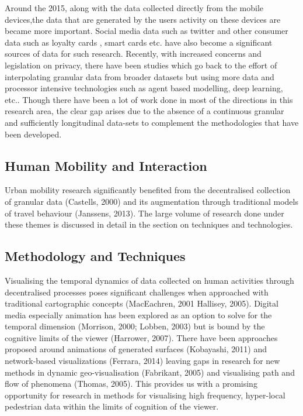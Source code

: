Around the 2015, along with the data collected directly from the mobile devices,the data that are generated by the users activity on these devices are became more important.
Social media data such as twitter \citep{lansley2016} and other consumer data such as loyalty cards \citep{lloyd2018}, smart cards \citep{ordonez2012} etc. have also become a significant sources of data for such research.
Recently, with increased concerns and legislation on privacy, there have been studies which go back to the effort of interpolating granular data from broader datasets but using more data and processor intensive technologies such as agent based modelling\cite[-2.5cm]{crols2019}, deep learning, etc.\cite{shibata2019}.
Though there have been a lot of work done in most of the directions in this research area, the clear gap arises due to the absence of a continuous granular and sufficiently longitudinal data-sets to complement the methodologies that have been developed. 


\subsection{Human Mobility and Interaction}
Urban mobility research significantly benefited from the decentralised collection of granular data (Castells, 2000) and its augmentation through traditional models of travel behaviour (Janssens, 2013).
The large volume of research done under these themes is discussed in detail in the section on techniques and technologies.

\subsection{Methodology and Techniques}
Visualising the temporal dynamics of data collected on human activities through decentralised processes poses significant challenges when approached with traditional cartographic concepts (MacEachren, 2001 Hallisey, 2005).
Digital media especially animation has been explored as an option to solve for the temporal dimension (Morrison, 2000; Lobben, 2003) but is bound by the cognitive limits of the viewer (Harrower, 2007).
There have been approaches proposed around animations of generated surfaces (Kobayashi, 2011) and network-based visualizations (Ferrara, 2014) leaving gaps in research for new methods in dynamic geo-visualisation (Fabrikant, 2005) and visualising path and flow of phenomena (Thomas, 2005).
This provides us with a promising opportunity for research in methods for visualising high frequency, hyper-local pedestrian data within the limits of cognition of the viewer.

